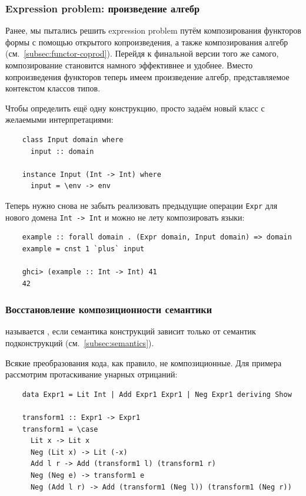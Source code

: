 \subsubsection{Expression problem: произведение алгебр}

Ранее, мы пытались решить expression problem путём композирования функторов формы с помощью открытого копроизведения, а также композирования алгебр (см.~\ref{subsec:functor-coprod}).
Перейдя к финальной версии того же самого, композирование становится намного эффективнее и удобнее.
Вместо копроизведения функторов теперь имеем произведение алгебр, представляемое контекстом классов типов.

Чтобы определить ещё одну конструкцию, просто задаём новый класс с желаемыми интерпретациями:
\begin{verbatim}
    class Input domain where
      input :: domain

    instance Input (Int -> Int) where
      input = \env -> env
\end{verbatim}

Теперь нужно снова не забыть реализовать предыдущие операции \texttt{Expr} для нового домена \texttt{Int -> Int} и можно не лету композировать языки:
\begin{verbatim}
    example :: forall domain . (Expr domain, Input domain) => domain
    example = cnst 1 `plus` input

    ghci> (example :: Int -> Int) 41
    42
\end{verbatim}

\subsubsection{Восстановление композиционности семантики} \label{subsubsec:recover-compositionality}

 называется , если семантика конструкций зависит только от семантик подконструкций (см.~\ref{subsec:semantics}).

Всякие преобразования кода, как правило, не композиционные.
Для примера рассмотрим протаскивание унарных отрицаний:
\begin{verbatim}
    data Expr1 = Lit Int | Add Expr1 Expr1 | Neg Expr1 deriving Show

    transform1 :: Expr1 -> Expr1
    transform1 = \case
      Lit x -> Lit x
      Neg (Lit x) -> Lit (-x)
      Add l r -> Add (transform1 l) (transform1 r)
      Neg (Neg e) -> transform1 e
      Neg (Add l r) -> Add (transform1 (Neg l)) (transform1 (Neg r))
\end{verbatim}

